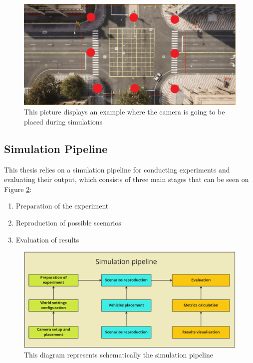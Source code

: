 \begin{figure} [h]
    \centering
    \includegraphics[width=\textwidth]{images/junction.png}
    \caption[Camera experiment positions]{This picture displays an example where the camera is going to be placed during simulations}
    \label{fig:camera_positions}
\end{figure}

\subsection{Simulation Pipeline}

This thesis relies on a simulation pipeline for conducting experiments and evaluating their output, which consists of three main stages that can be seen on Figure \ref{fig:evaluation_pipeline}: 

\begin{enumerate}
    \item Preparation of the experiment
    \item Reproduction of possible scenarios
    \item Evaluation of results
\end{enumerate}


\begin{figure} [h]
    \centering
    \includegraphics[width=\textwidth]{images/evaluation_pipeline.png}
    \caption[Evaluation pipeline]{This diagram represents schematically the simulation pipeline}
    \label{fig:evaluation_pipeline}
\end{figure}